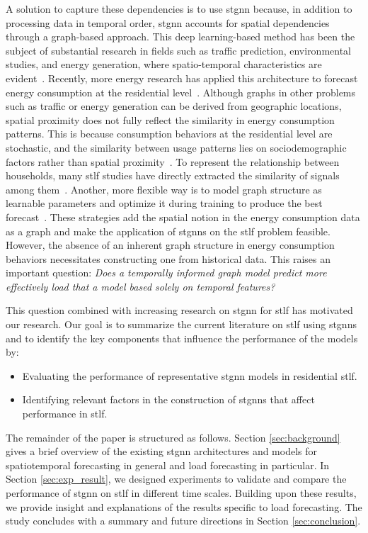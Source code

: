 A solution to capture these dependencies is to use \acrfull{stgnn} because, in addition to processing data in temporal order, \acrshort{stgnn} accounts for spatial dependencies through a graph-based approach. 
This deep learning-based method has been the subject of substantial research in fields such as traffic prediction, environmental studies, and energy generation, where spatio-temporal characteristics are evident~\cite{bui_spatial-temporal_2022}. 
Recently, more energy research has applied this architecture to forecast energy consumption at the residential level~\cite{arastehfar_short-term_2022, lin_residential_2021}. Although graphs in other problems such as traffic or energy generation can be derived from geographic locations, spatial proximity does not fully reflect the similarity in energy consumption patterns. This is because consumption behaviors at the residential level are stochastic, and the similarity between usage patterns lies on sociodemographic factors rather than spatial proximity~\cite{Feng2023STGNetSR}. To represent the relationship between households, many \acrshort{stlf} studies have directly extracted the similarity of signals among them~\cite{bloemheuvel_graph_2024}. Another, more flexible way is to model graph structure as learnable parameters and optimize it during training to produce the best forecast~\cite{lin_residential_2021,wei_short-term_2023}. These strategies add the spatial notion in the energy consumption data as a graph and make the application of \glspl{stgnn} on the \acrshort{stlf} problem feasible. However, the absence of an inherent graph structure in energy consumption behaviors necessitates constructing one from historical data. This raises an important question: \textit{Does a temporally informed graph model predict more effectively load that a model based solely on temporal features?}

This question combined with increasing research on \acrshort{stgnn} for \acrshort{stlf} has motivated our research. Our goal is to summarize the current literature on \acrshort{stlf} using \glspl{stgnn} and to identify the key components that influence the performance of the models by:
\begin{itemize}
    \item Evaluating the performance of representative \acrshort{stgnn} models in residential \acrshort{stlf}. 
    \item Identifying relevant factors in the construction of \glspl{stgnn} that affect performance in \acrshort{stlf}. 
\end{itemize}

The remainder of the paper is structured as follows. Section \ref{sec:background} gives a brief overview of the existing \acrshort{stgnn} architectures and models for spatiotemporal forecasting in general and load forecasting in particular. In Section \ref{sec:exp_result}, we designed experiments to validate and compare the performance of \acrshort{stgnn} on \acrshort{stlf} in different time scales. Building upon these results, we provide insight and explanations of the results specific to load forecasting. The study concludes with a summary and future directions in Section \ref{sec:conclusion}.  
